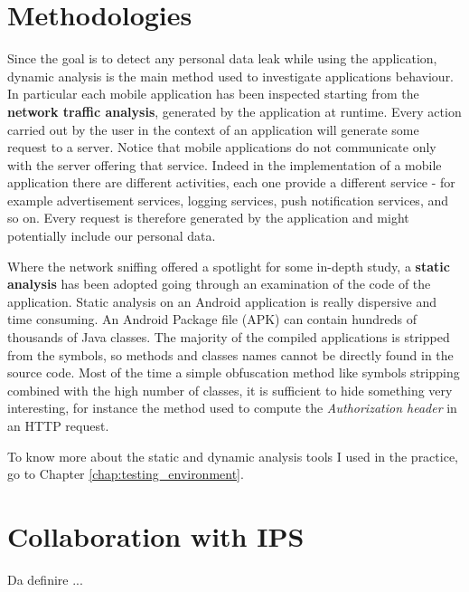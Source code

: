	\section{Methodologies}
		\par Since the goal is to detect any personal data leak while using the application, dynamic analysis is the main method used to investigate applications behaviour. In particular each mobile application has been inspected starting from the \textbf{network traffic analysis}, generated by the application at runtime. \newline
		Every action carried out by the user in the context of an application will generate some request to a server. Notice that mobile applications do not communicate only with the server offering that service. Indeed in the implementation of a mobile application there are different activities, each one provide a different service - for example advertisement services, logging services, push notification services, and so on. Every request is therefore generated by the application and might potentially include our personal data.		
		\par Where the network sniffing offered a spotlight for some in-depth study, a \textbf{static analysis} has been adopted going through an examination of the code of the application. Static analysis on an Android application is really dispersive and time consuming. An Android Package file (APK) can contain hundreds of thousands of Java classes. The majority of the compiled applications is stripped from the symbols, so methods and classes names cannot be directly found in the source code. Most of the time a simple obfuscation method like symbols stripping combined with the high number of classes, it is sufficient to hide something very interesting, for instance the method used to compute the \textit{Authorization header} in an HTTP request.
		\par To know more about the static and dynamic analysis tools I used in the practice, go to Chapter \ref{chap:testing_environment}.
				
	\section{Collaboration with IPS}
		\par Da definire ...

